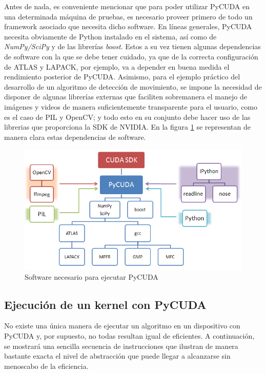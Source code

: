\documentclass[twocolumn,twoside]{Jornadas}
\begin{document}
Antes de nada, es conveniente mencionar que para poder utilizar PyCUDA en una determinada máquina de pruebas, es necesario proveer primero de todo un framework asociado que necesita dicho software. En líneas generales, PyCUDA necesita obviamente de Python instalado en el sistema, así como de \emph{NumPy/SciPy} y de las librerías \emph{boost}. Estos a su vez tienen algunas dependencias de software con la que se debe tener cuidado, ya que de la correcta configuración de ATLAS y LAPACK, por ejemplo, va a depender en buena medida el rendimiento posterior de PyCUDA. Asimismo, para el ejemplo práctico del desarrollo de un algoritmo de detección de movimiento, se impone la necesidad de disponer de algunas librerías externas que faciliten sobremanera el manejo de imágenes y videos de manera suficientemente transparente para el usuario, como es el caso de PIL y OpenCV; y todo esto en su conjunto debe hacer uso de las librerias que proporciona la SDK de NVIDIA. En la figura \ref{fig:installedDependecies} se representan de manera clara estas dependencias de software.

\begin{figure}
   \begin{center}
      \includegraphics[width=.5\textwidth]{installedDependecies.png}
      \caption{\label{fig:installedDependecies} Software necesario para ejecutar PyCUDA}
   \end{center}
\end{figure}

\subsection{Ejecución de un kernel con PyCUDA}

No existe una única manera de ejecutar un algoritmo en un dispositivo con PyCUDA y, por supuesto, no todas resultan igual de eficientes. A continuación, se mostrará una sencilla secuencia de instrucciones que ilustran de manera bastante exacta el nivel de abstracción que puede llegar a alcanzarse sin menoscabo de la eficiencia.
\end{document}
